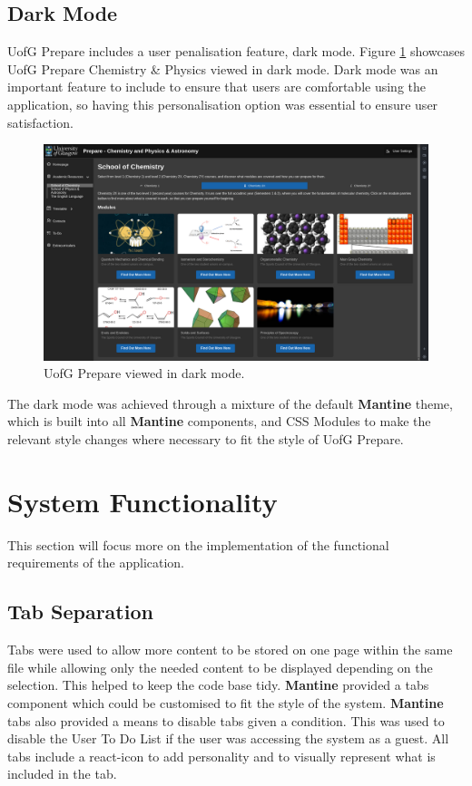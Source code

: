 \documentclass{l4proj}
\begin{document}
\subsection{Dark Mode}
UofG Prepare includes a user penalisation feature,  dark mode. Figure \ref{fig:darkmode} showcases UofG Prepare Chemistry \& Physics viewed in dark mode. Dark mode was an important feature to include to ensure that users are comfortable using the application,  so having this personalisation option was essential to ensure user satisfaction.

\begin{figure}[ht]
    \centering
    \includegraphics[width=0.9\linewidth]{images/darkmode.pdf}    

    \caption{UofG Prepare viewed in dark mode.}

    \label{fig:darkmode} 
\end{figure}

The dark mode was achieved through a mixture of the default \textbf{Mantine} theme,  which is built into all \textbf{Mantine} components,  and CSS Modules to make the relevant style changes where necessary to fit the style of UofG Prepare.

\section{System Functionality}
This section will focus more on the implementation of the functional requirements of the application.

\subsection{Tab Separation} \label{tabs}
Tabs were used to allow more content to be stored on one page within the same file while allowing only the needed content to be displayed depending on the selection. This helped to keep the code base tidy. \textbf{Mantine} provided a tabs component which could be customised to fit the style of the system. \textbf{Mantine} tabs also provided a means to disable tabs given a condition. This was used to disable the User To Do List if the user was accessing the system as a guest. All tabs include a react-icon to add personality and to visually represent what is included in the tab.
\end{document}
